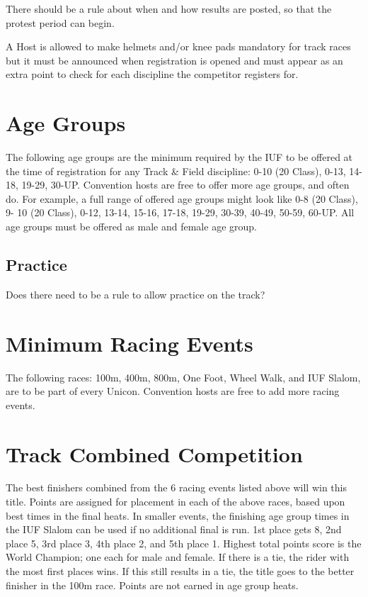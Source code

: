 \begin{comment2016}
There should be a rule about when and how results are posted, so that the
protest period can begin.
\end{comment2016}

A Host is allowed to make helmets and/or knee pads mandatory for track races but it must be announced when registration is opened and must appear as an extra point to check for each discipline the competitor registers for.

\section{Age Groups \label{subsec:track-field_racing-categories_age-groups}}
The following age groups are the minimum required by the IUF to be offered at the time of registration for any Track \& Field discipline: 0-10 (20 Class), 0-13, 14-18, 19-29, 30-UP.
Convention hosts are free to offer more age groups, and often do.
For example, a full range of offered age groups might look like 0-8 (20 Class), 9- 10 (20 Class), 0-12, 13-14, 15-16, 17-18, 19-29, 30-39, 40-49, 50-59, 60-UP.
All age groups must be offered as male and female age group.

\begin{comment2016}
\section{Practice}

Does there need to be a rule to allow practice on the track?
\end{comment2016}

\section{Minimum Racing Events \label{sec:track-field_minimum-racing-events}}
The following races: 100m, 400m, 800m, One Foot, Wheel Walk, and IUF Slalom, are to be part of every Unicon.
Convention hosts are free to add more racing events.

\section{Track Combined Competition}%
The best finishers combined from the 6 racing events listed above will win this title.
Points are assigned for placement in each of the above races, based upon best times in the final heats.
In smaller events, the finishing age group times in the IUF Slalom can be used if no additional final is run.
1st place gets 8, 2nd place 5, 3rd place 3, 4th place 2, and 5th place 1.
Highest total points score is the World Champion; one each for male and female.
If there is a tie, the rider with the most first places wins.
If this still results in a tie, the title goes to the better finisher in the 100m race.
Points are not earned in age group heats.

